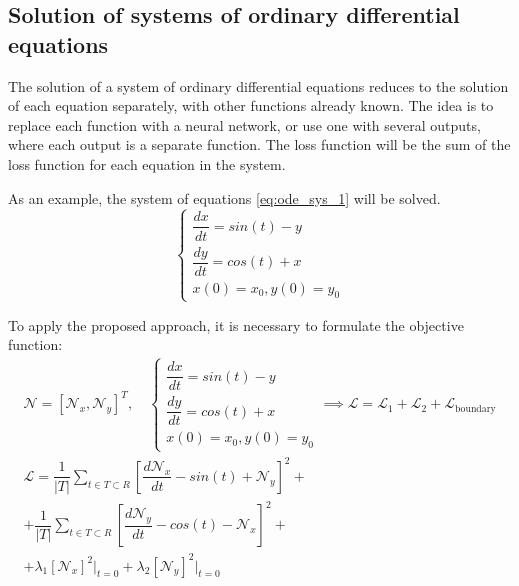 \newpage

\subsection*{Solution of systems of ordinary differential equations}
The solution of a system of ordinary differential equations reduces to the solution of each equation separately, with other functions already known. The idea is to replace each function with a neural network, or use one with several outputs, where each output is a separate function. The loss function will be the sum of the loss function for each equation in the system.

As an example, the system of equations \eqref{eq:ode_sys_1}  will be solved.
\begin{equation}
	 \label{eq:ode_sys_1}
	\begin{cases}
		\dfrac{d x}{d t} = sin(t) - y \\[10pt]
		\dfrac{d y}{d t} = cos(t) + x \\[10pt]
		x(0) = x_0, y(0) = y_0
	\end{cases}
\end{equation}

To apply the proposed approach, it is necessary to formulate the objective function:
\begin{equation}
	\label{eq:loss_ode_sys_1}
	\begin{multlined}
		\mathcal{N} = [ \mathcal{N}_x, \mathcal{N}_y ]^T, \quad
		\begin{cases}
			\dfrac{d x}{d t} = sin(t) - y \\[10pt]
			\dfrac{d y}{d t} = cos(t) + x \\[10pt]
			x(0) = x_0, y(0) = y_0
		\end{cases} \implies \mathcal{L} = \mathcal{L}_1 + \mathcal{L}_2 + \mathcal{L}_{\text{boundary}} \\ \mathcal{L} = \dfrac{1}{\left | T \right |} \sum_{t \in T \subset R} \left [ \dfrac{d \mathcal{N}_x}{d t} - sin(t) + \mathcal{N}_y \right ]^2 + \\ + \dfrac{1}{\left | T \right |} \sum_{t \in T \subset R} \left [ \dfrac{d \mathcal{N}_y}{d t} - cos(t) - \mathcal{N}_x \right ]^2 + \\ + \lambda_1 \left [ \mathcal{N}_x \right ]^2 \big|_{t = 0} + \lambda_2 \left [ \mathcal{N}_y \right ]^2 \big|_{t = 0}
	\end{multlined}
\end{equation}

